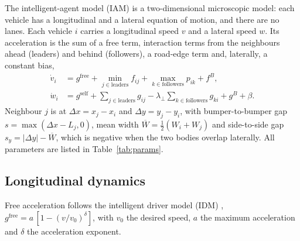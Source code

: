 \documentclass[11pt]{article}
\begin{document}
The intelligent-agent model (IAM) \cite{iam} is a two-dimensional microscopic
model: each vehicle has a longitudinal and a lateral equation of motion, and
there are no lanes. Each vehicle $i$ carries a longitudinal speed $v$ and a
lateral speed $w$. Its acceleration is the sum of a free term, interaction terms
from the neighbours ahead (leaders) and behind (followers), a road-edge term and,
laterally, a constant bias,
\begin{equation}
\begin{aligned}
\dot v_i&=g^{\mathrm{free}}+\min_{j\in\text{leaders}}f_{ij}
+\max_{k\in\text{followers}}p_{ik}+f^{B},\\
\dot w_i&=g^{\mathrm{self}}+\sum_{j\in\text{leaders}}g_{ij}
-\lambda_\perp\sum_{k\in\text{followers}}g_{ki}+g^{B}+\beta.
\end{aligned}
\label{eq:main}
\end{equation}
Neighbour $j$ is at $\Delta x=x_j-x_i$ and $\Delta y=y_j-y_i$, with
bumper-to-bumper gap $s=\max(\Delta x-L_j,0)$, mean width
$\overline W=\tfrac12(W_i+W_j)$ and side-to-side gap $s_y=|\Delta y|-\overline W$,
which is negative when the two bodies overlap laterally. All parameters are
listed in Table~\ref{tab:params}.

\subsection{Longitudinal dynamics}
Free acceleration follows the intelligent driver model (IDM) \cite{idm},
$g^{\mathrm{free}}=a\,[1-(v/v_0)^{\delta}]$, with $v_0$ the desired speed, $a$
the maximum acceleration and $\delta$ the acceleration exponent.
\end{document}
